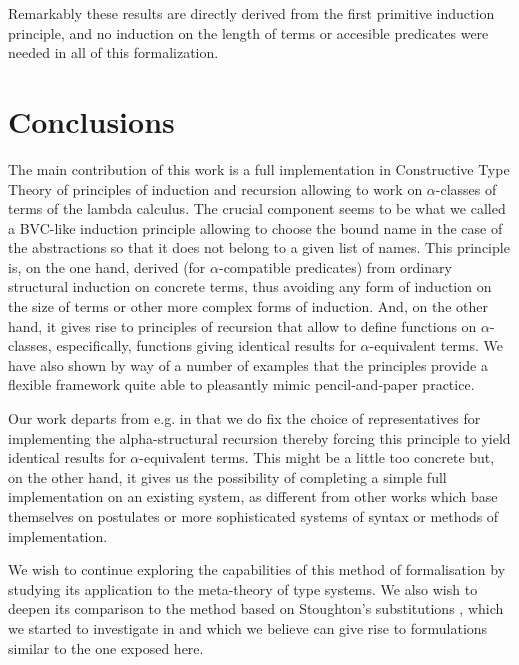 \documentclass{entcs}
\begin{document}

Remarkably these results are directly derived from the first primitive induction principle, and no induction on the length of terms or accesible predicates were needed in all of this formalization.

\section{Conclusions}
The main contribution of this work is a full implementation in Constructive Type Theory of principles of induction and recursion allowing to work on $\alpha$-classes of terms of the lambda calculus. The crucial component seems to be what we called a BVC-like induction principle allowing to choose the bound name in the case of the abstractions so that it does not belong to a given list of names. This principle is, on the one hand, derived (for $\alpha$-compatible predicates) from ordinary structural induction on concrete terms, thus avoiding any form of induction on the size of terms or other more complex forms of induction. And, on the other hand, it gives rise to principles of recursion that allow to define functions on $\alpha$-classes, especifically, functions giving identical results for $\alpha$-equivalent terms. We have also shown by way of a number of examples that the principles provide a flexible framework quite able to pleasantly mimic pencil-and-paper practice.

Our work departs from e.g. \cite{Pitts2} in that we do fix the choice of representatives for implementing the alpha-structural recursion thereby forcing this principle to yield identical results for $\alpha$-equivalent terms. This might be a little too concrete  but, on the other hand, it gives us the possibility of completing a simple full implementation on an existing system, as different from other works which base themselves on postulates or more sophisticated systems of syntax or methods of implementation.

We wish to continue exploring the capabilities of this method of formalisation by studying its application to the meta-theory of type systems. We also wish to deepen its comparison to the method  based on Stoughton's substitutions \cite{stoughton}, which we started to investigate in \cite{nos} and which we believe can give rise to formulations similar to the one exposed here.

\appendix
\end{document}

